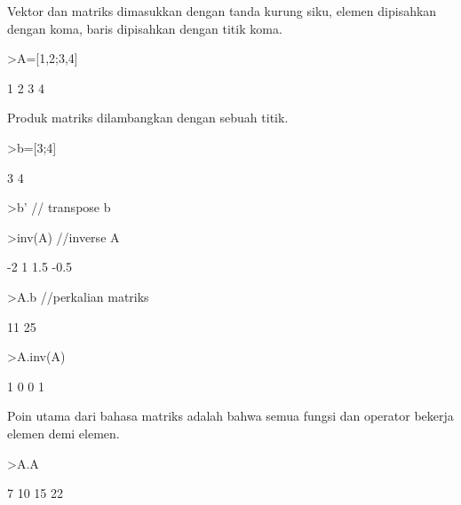 \documentclass[a4paper,10pt]{article}
\begin{document}
\begin{eulernotebook}
\begin{eulercomment}
\begin{eulercomment}
\begin{eulercomment}
\begin{eulercomment}
\begin{eulercomment}
\begin{eulercomment}
\begin{eulercomment}
Vektor dan matriks dimasukkan dengan tanda kurung siku, elemen
dipisahkan dengan koma, baris dipisahkan dengan titik koma.
\end{eulercomment}
\begin{eulerprompt}
>A=[1,2;3,4]
\end{eulerprompt}
\begin{euleroutput}
              1             2 
              3             4 
\end{euleroutput}
\begin{eulercomment}
Produk matriks dilambangkan dengan sebuah titik.
\end{eulercomment}
\begin{eulerprompt}
>b=[3;4]
\end{eulerprompt}
\begin{euleroutput}
              3 
              4 
\end{euleroutput}
\begin{eulerprompt}
>b' // transpose b
\end{eulerprompt}
\begin{euleroutput}
  [3,  4]
\end{euleroutput}
\begin{eulerprompt}
>inv(A) //inverse A
\end{eulerprompt}
\begin{euleroutput}
             -2             1 
            1.5          -0.5 
\end{euleroutput}
\begin{eulerprompt}
>A.b //perkalian matriks
\end{eulerprompt}
\begin{euleroutput}
             11 
             25 
\end{euleroutput}
\begin{eulerprompt}
>A.inv(A)
\end{eulerprompt}
\begin{euleroutput}
              1             0 
              0             1 
\end{euleroutput}
\begin{eulercomment}
Poin utama dari bahasa matriks adalah bahwa semua fungsi dan operator
bekerja elemen demi elemen.
\end{eulercomment}
\begin{eulerprompt}
>A.A
\end{eulerprompt}
\begin{euleroutput}
              7            10 
             15            22 
\end{euleroutput}

\end{eulercomment}
\end{eulercomment}
\end{eulercomment}
\end{eulercomment}
\end{eulercomment}
\end{eulercomment}
\end{eulernotebook}
\end{document}
